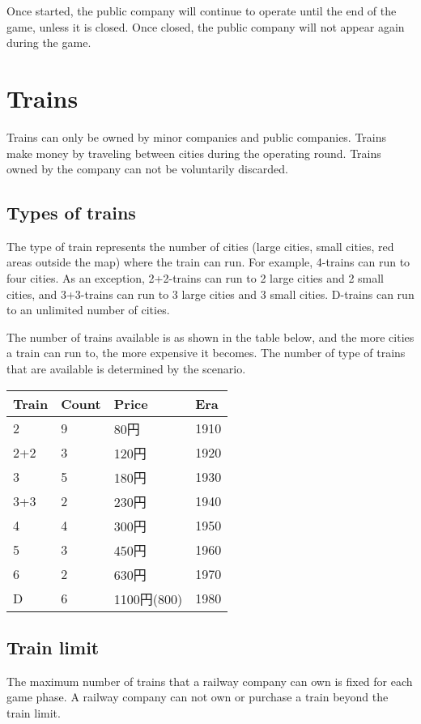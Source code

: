 \documentclass{article}
\begin{document}
\begin{CJK}{UTF8}{min}
\begin{multicols}{2}
Once started, the public company will continue to operate until the
end of the game, unless it is closed. Once closed, the public company
will not appear again during the game.


\section{Trains}
Trains can only be owned by minor companies and public
companies. Trains make money by traveling between cities during the
operating round. Trains owned by the company can not be voluntarily
discarded.

\subsection{Types of trains}
\label{sec:train-types}
The type of train represents the number of cities (large cities, small
cities, red areas outside the map) where the train can run. For
example, 4-trains can run to four cities. As an exception, 2+2-trains
can run to 2 large cities and 2 small cities, and 3+3-trains can run to 3
large cities and 3 small cities. D-trains can run to an unlimited
number of cities.

The number of trains available is as shown in the table below, and the
more cities a train can run to, the more expensive it becomes. The
number of type of trains that are available is determined by the
scenario.

\begin{tabular}{|l|l|l|l|}
\hline
Train & Count & Price & Era \\
\hline
2 & 9 & 80円 & 1910 \\
2+2 & 3 & 120円 & 1920 \\
3 & 5 & 180円 & 1930 \\
3+3 & 2 & 230円 & 1940 \\
4 & 4 & 300円 & 1950 \\
5 & 3 & 450円 & 1960 \\
6 & 2 & 630円 & 1970 \\
D & 6 & 1100円(800) & 1980 \\
\hline
\end{tabular}

\subsection{Train limit}

The maximum number of trains that a railway company can own is fixed
for each game phase. A railway company can not own or purchase a
train beyond the train limit.


\end{multicols}
\end{CJK}
\end{document}
